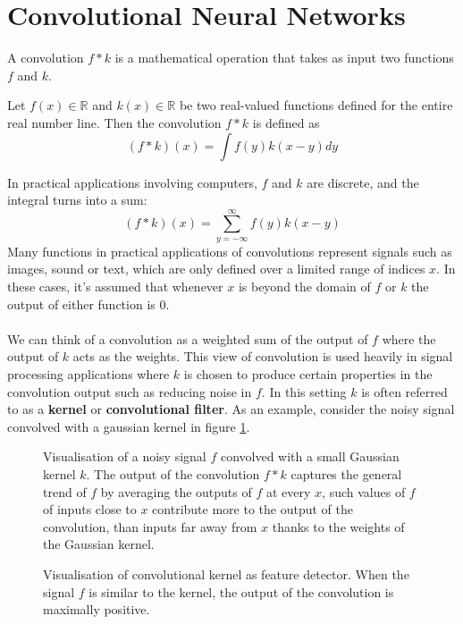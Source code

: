 \section{Convolutional Neural Networks}
A convolution $f * k$ is a mathematical operation that takes as input two functions $f$ and $k$.

\begin{definition}[convolution] \label{convolution}
	Let $f(x) \in \mathbb{R}$ and $k(x) \in \mathbb{R}$ be two real-valued functions defined for the entire real number line. Then the convolution $f * k$ is defined as
	$$
		(f * k)(x) = \int f(y)k(x - y)dy
	$$
\end{definition}

In practical applications involving computers, $f$ and $k$ are discrete, and the integral turns into a sum:
$$
(f * k)(x) = \sum\limits_{y=-\infty}^\infty f(y)k(x - y)
$$
Many functions in practical applications of convolutions represent signals such as images, sound or text, which are only defined over a limited range of indices $x$. In these cases, it's assumed that whenever $x$ is beyond the domain of $f$ or $k$ the output of either function is 0.
\\\\
We can think of a convolution as a weighted sum of the output of $f$ where the output of $k$ acts as the weights. This view of convolution is used heavily in signal processing applications where $k$ is chosen to produce certain properties in the convolution output such as reducing noise in $f$. In this setting $k$ is often referred to as a \textbf{kernel} or \textbf{convolutional filter}. As an example, consider the noisy signal convolved with a gaussian kernel in figure \ref{gaussian_convolution}.

\begin{figure}
	\centering
	
	\caption{Visualisation of a noisy signal $f$ convolved with a small Gaussian kernel $k$. The output of the convolution $f * k$ captures the general trend of $f$ by averaging the outputs of $f$ at every $x$, such values of $f$ of inputs close to $x$ contribute more to the output of the convolution, than inputs far away from $x$ thanks to the weights of the Gaussian kernel.}
	\label{gaussian_convolution}
\end{figure}

\begin{figure}
	\centering
	
	\caption{Visualisation of convolutional kernel as feature detector. When the signal $f$ is similar to the kernel, the output of the convolution is maximally positive.}
	\label{feature_detector}
\end{figure}

